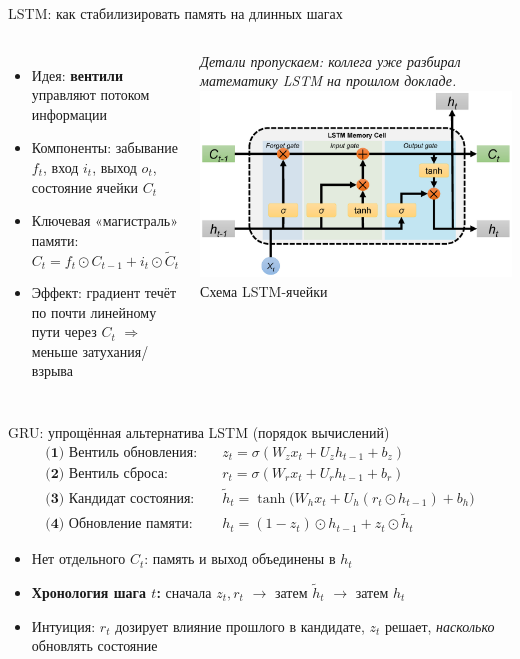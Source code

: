 \documentclass[aspectratio=1610,12pt]{beamer}
\begin{document}
\begin{frame}{LSTM: как стабилизировать память на длинных шагах}
\begin{columns}[T,onlytextwidth]
\begin{itemize}
  \item Идея: \textbf{вентили} управляют потоком информации
  \item Компоненты: забывание $f_t$, вход $i_t$, выход $o_t$, состояние ячейки $C_t$
  \item Ключевая «магистраль» памяти:
  \[
  C_t = f_t \odot C_{t-1} + i_t \odot \tilde{C}_t
  \]
  \item Эффект: градиент течёт по почти линейному пути через $C_t$ $\Rightarrow$ меньше затухания/взрыва
\end{itemize}
\footnotesize
\textit{Детали пропускаем: коллега уже разбирал математику LSTM на прошлом докладе.}
\centering
\includegraphics[width=\linewidth]{LSTM.png}\\
\footnotesize Схема LSTM-ячейки
\end{columns}
\end{frame}

\begin{frame}{GRU: упрощённая альтернатива LSTM (порядок вычислений)}
\small
\[
\begin{aligned}
\textbf{(1) Вентиль обновления:}\quad
& z_t = \sigma(W_z x_t + U_z h_{t-1} + b_z) \\
\textbf{(2) Вентиль сброса:}\quad
& r_t = \sigma(W_r x_t + U_r h_{t-1} + b_r) \\
\textbf{(3) Кандидат состояния:}\quad
& \tilde{h}_t = \tanh\!\big(W_h x_t + U_h (r_t \odot h_{t-1}) + b_h\big) \\
\textbf{(4) Обновление памяти:}\quad
& h_t = (1 - z_t)\odot h_{t-1} + z_t \odot \tilde{h}_t
\end{aligned}
\]
\begin{itemize}
  \item Нет отдельного $C_t$: память и выход объединены в $h_t$
  \item \textbf{Хронология шага $t$:} сначала $z_t, r_t$ $\rightarrow$ затем $\tilde{h}_t$ $\rightarrow$ затем $h_t$
  \item Интуиция: $r_t$ дозирует влияние прошлого в кандидате, $z_t$ решает, \emph{насколько} обновлять состояние
\end{itemize}
\end{frame}
\end{document}
